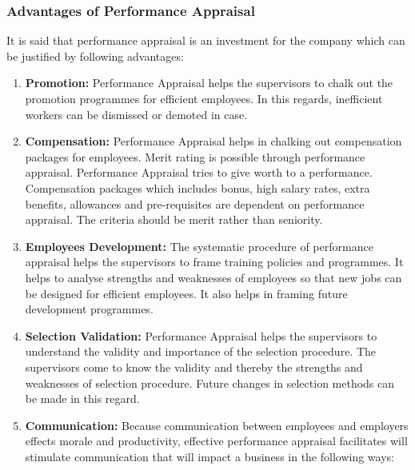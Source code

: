 \documentclass[]{book}
\begin{document}
\hypertarget{advantages-of-performance-appraisal}{%
\subsubsection{Advantages of Performance Appraisal}\label{advantages-of-performance-appraisal}}

It is said that performance appraisal is an investment for the company which can be justified by following advantages:

\begin{enumerate}
\def\labelenumi{\arabic{enumi}.}
\item
  \textbf{Promotion:} Performance Appraisal helps the supervisors to chalk out the promotion programmes for efficient employees. In this regards, inefficient workers can be dismissed or demoted in case.
\item
  \textbf{Compensation:} Performance Appraisal helps in chalking out compensation packages for employees. Merit rating is possible through performance appraisal. Performance Appraisal tries to give worth to a performance. Compensation packages which includes bonus, high salary rates, extra benefits, allowances and pre-requisites are dependent on performance appraisal. The criteria should be merit rather than seniority.
\item
  \textbf{Employees Development:} The systematic procedure of performance appraisal helps the supervisors to frame training policies and programmes. It helps to analyse strengths and weaknesses of employees so that new jobs can be designed for efficient employees. It also helps in framing future development programmes.
\item
  \textbf{Selection Validation:} Performance Appraisal helps the supervisors to understand the validity and importance of the selection procedure. The supervisors come to know the validity and thereby the strengths and weaknesses of selection procedure. Future changes in selection methods can be made in this regard.
\item
  \textbf{Communication:} Because communication between employees and employers effects morale and productivity, effective performance appraisal facilitates will stimulate communication that will impact a business in the following ways:


\end{enumerate}
\end{document}
